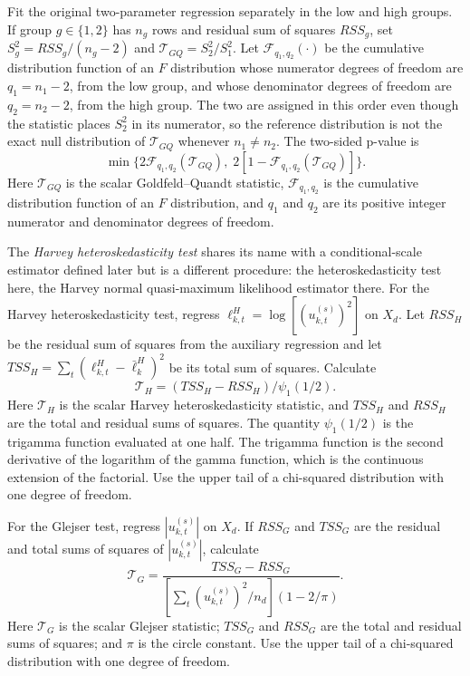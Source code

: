 \documentclass[11pt]{article}
\begin{document}
Fit the original two-parameter regression separately in the low and high groups. If group
\(g\in\{1,2\}\) has \(n_g\) rows and residual sum of squares \(RSS_g\), set
\(S_g^2=RSS_g/(n_g-2)\) and
\(\mathcal T_{GQ}=S_2^2/S_1^2\). Let \(\mathcal F_{q_1,q_2}(\cdot)\) be the cumulative distribution function of an \(F\)
distribution whose numerator degrees of freedom are \(q_1=n_1-2\), from the low group, and whose
denominator degrees of freedom are \(q_2=n_2-2\), from the high group. The two are assigned in this
order even though the statistic places \(S_2^2\) in its numerator, so the reference distribution is
not the exact null distribution of \(\mathcal T_{GQ}\) whenever \(n_1\ne n_2\). The two-sided p-value is
\[
 \min\{2\mathcal F_{q_1,q_2}(\mathcal T_{GQ}),\;2[1-\mathcal F_{q_1,q_2}(\mathcal T_{GQ})]\}.
\]
Here \(\mathcal T_{GQ}\) is the scalar Goldfeld--Quandt statistic,
\(\mathcal F_{q_1,q_2}\) is the cumulative distribution function of an \(F\) distribution, and \(q_1\) and \(q_2\) are its positive integer numerator and denominator degrees of freedom.

The \emph{Harvey heteroskedasticity test} shares its name with a conditional-scale estimator defined
later but is a different procedure: the heteroskedasticity test here, the Harvey normal quasi-maximum
likelihood estimator there. For the Harvey heteroskedasticity test, regress
\(\ell_{k,t}^{H}=\log[(u_{k,t}^{(s)})^2]\) on \(X_d\). Let \(RSS_H\) be the residual sum of
squares from the auxiliary regression and let
\(TSS_H=\sum_t(\ell_{k,t}^{H}-\bar\ell_k^{H})^2\) be its total sum of squares. Calculate
\[
 \mathcal T_H=(TSS_H-RSS_H)/\psi_1(1/2).
\]
Here \(\mathcal T_H\) is the scalar Harvey heteroskedasticity statistic, and \(TSS_H\) and \(RSS_H\) are the total
and residual sums of squares. The quantity \(\psi_1(1/2)\) is the trigamma function evaluated at one
half. The trigamma function is the second derivative of the logarithm of the gamma function, which
is the continuous extension of the factorial.
Use the upper tail of a chi-squared distribution with one degree of freedom.

For the Glejser test, regress \(|u_{k,t}^{(s)}|\) on \(X_d\). If \(RSS_G\) and \(TSS_G\) are the
residual and total sums of squares of \(|u_{k,t}^{(s)}|\), calculate
\[
 \mathcal T_G=\frac{TSS_G-RSS_G}
 {[\sum_t(u_{k,t}^{(s)})^2/n_d](1-2/\pi)}.
\]
Here \(\mathcal T_G\) is the scalar Glejser statistic; \(TSS_G\) and \(RSS_G\) are the total and
residual sums of squares; and \(\pi\) is the circle constant. Use the upper tail of a chi-squared
distribution with one degree of freedom.
\end{document}
